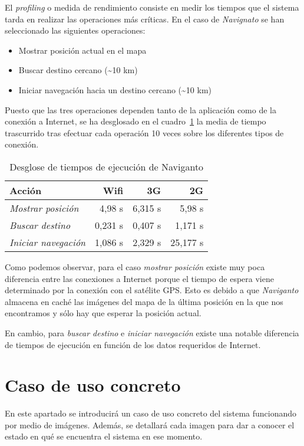 El \emph{profiling} o medida de rendimiento consiste en medir los tiempos que el sistema tarda en
realizar las operaciones más críticas. En el caso de \emph{Navignato} se han seleccionado las
siguientes operaciones:

\begin{itemize}
  \item Mostrar posición actual en el mapa
  \item Buscar destino cercano (\textasciitilde{}10 km)
  \item Iniciar navegación hacia un destino cercano (\textasciitilde{}10 km)
\end{itemize}

Puesto que las tres operaciones dependen tanto de la aplicación como de la conexión a Internet, se
ha desglosado en el cuadro~\ref{cuadro:conexion} la media de tiempo trascurrido tras efectuar cada
operación 10 veces sobre los diferentes tipos de conexión.

\begin{table}[h]
  \centering
  \begin{tabular}{|l|r|r|r|}
    \hline
    \textbf{Acción} & \textbf{Wifi} & \textbf{3G} & \textbf{2G} \\
    \hline
    \emph{Mostrar posición}   &  4,98 s & 6,315 s &   5,98 s \\
    \hline
    \emph{Buscar destino}     & 0,231 s & 0,407 s &  1,171 s \\
    \hline
    \emph{Iniciar navegación} & 1,086 s & 2,329 s & 25,177 s \\
    \hline
  \end{tabular}
  \caption{Desglose de tiempos de ejecución de Naviganto}
  \label{cuadro:conexion}
\end{table}

Como podemos observar, para el caso \emph{mostrar posición} existe muy poca diferencia entre las
conexiones a Internet porque el tiempo de espera viene determinado por la conexión con el satélite
\acs{GPS}. Esto es debido a que \emph{Naviganto} almacena en caché las imágenes del mapa de la
última posición en la que nos encontramos y sólo hay que esperar la posición actual.

En cambio, para \emph{buscar destino} e \emph{iniciar navegación} existe una notable diferencia de
tiempos de ejecución en función de los datos requeridos de Internet.

\section{Caso de uso concreto}
En este apartado se introducirá un caso de uso concreto del sistema funcionando por medio de
imágenes. Además, se detallará cada imagen para dar a conocer el estado en qué se encuentra el
sistema en ese momento.

